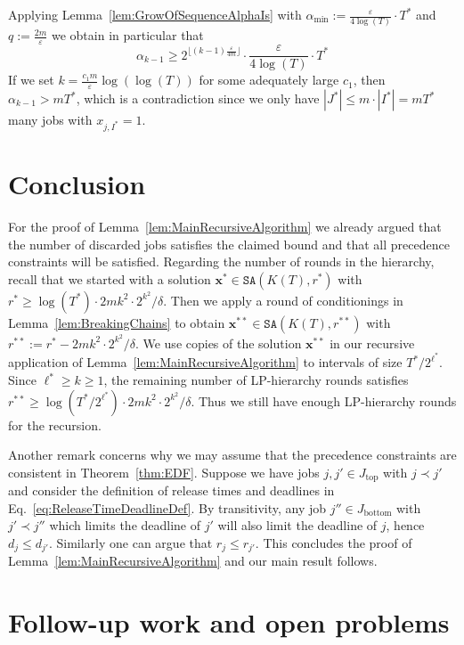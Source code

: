 \documentclass[11pt,letterpaper,oneside,english]{article}
\theoremstyle{theorem}
\begin{document}
Applying Lemma~\ref{lem:GrowOfSequenceAlphaIs} with $\alpha_{\min} := \frac{\varepsilon}{4\log(T)} \cdot T^*$ and
$q := \frac{2m}{\varepsilon}$ we obtain in particular that 
\[
  \alpha_{k-1} \geq 2^{\lfloor (k-1) \frac{\varepsilon}{4m} \rfloor} \cdot \frac{\varepsilon}{4\log(T)} \cdot T^*
\]
If we set  
$k =\frac{c_1m}{\varepsilon} \log(\log(T))$ for some adequately large $c_1$, then
 $\alpha_{k-1} > mT^*$, which is a contradiction
since we only have $|J^*| \leq m \cdot |I^*| = mT^*$ many jobs with $x_{j,I^*} = 1$. 


\section{Conclusion} 

For the proof of Lemma~\ref{lem:MainRecursiveAlgorithm} we already argued that the
number of discarded jobs satisfies the claimed bound and that all precedence constraints
will be satisfied. Regarding the number of rounds in the hierarchy, recall that
we started with a solution $\bm{x}^* \in \texttt{SA}(K(T),r^*)$ with $r^* \geq \log(T^*) \cdot 2mk^2 \cdot 2^{k^2} / \delta$. Then we apply a round of conditionings in Lemma~\ref{lem:BreakingChains} 
to obtain $\bm{x}^{**} \in \texttt{SA}(K(T),r^{**})$ with $r^{**} := r^* -2mk^2 \cdot 2^{k^2} / \delta$.
We use copies of the solution $\bm{x}^{**} $ in our recursive application of Lemma~\ref{lem:MainRecursiveAlgorithm} to intervals of size $T^* / 2^{\ell^*}$. Since $\ell^* \geq k \geq 1$, the remaining 
number of LP-hierarchy rounds satisfies $r^{**} \geq \log(T^* / 2^{\ell^*}) \cdot 2mk^2 \cdot 2^{k^2} / \delta$. Thus we still have enough LP-hierarchy rounds for the recursion.  

Another remark concerns why we may assume that the precedence constraints are consistent in 
Theorem~\ref{thm:EDF}. 
Suppose we have jobs $j,j' \in J_{\textrm{top}}$ with $j \prec j'$ and consider the definition of release times and
deadlines in Eq.~\ref{eq:ReleaseTimeDeadlineDef}. By transitivity, any job $j'' \in J_{\textrm{bottom}}$ with $j' \prec j''$ which limits the deadline
of $j'$ will also limit the deadline of $j$, hence $d_j \leq d_{j'}$. Similarly one can argue
that $r_{j} \leq r_{j'}$.
This concludes the proof of Lemma~\ref{lem:MainRecursiveAlgorithm}
and our main result follows. 

\section{Follow-up work and open problems}
\end{document}
